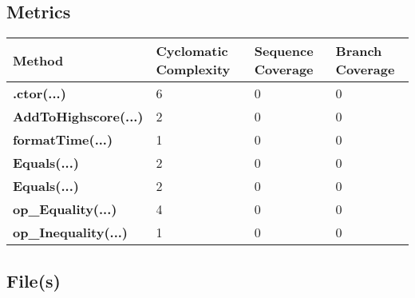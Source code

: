 \documentclass[a4paper,10pt]{article}
\begin{document}
\subsection{Metrics}
\begin{longtable}[l]{|l|l|l|l|}
\hline
\textbf{Method} & \textbf{Cyclomatic Complexity} & \textbf{Sequence Coverage} & \textbf{Branch Coverage}\\
\hline
\textbf{.ctor(...)} & 6 & 0 & 0\\
\hline
\textbf{AddToHighscore(...)} & 2 & 0 & 0\\
\hline
\textbf{formatTime(...)} & 1 & 0 & 0\\
\hline
\textbf{Equals(...)} & 2 & 0 & 0\\
\hline
\textbf{Equals(...)} & 2 & 0 & 0\\
\hline
\textbf{op\_Equality(...)} & 4 & 0 & 0\\
\hline
\textbf{op\_Inequality(...)} & 1 & 0 & 0\\
\hline
\end{longtable}
\subsection{File(s)}
\end{document}
